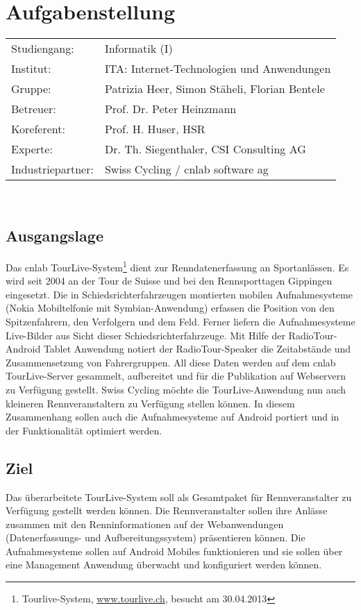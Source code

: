 \chapter*{Aufgabenstellung}
\begin{tabular}{ll}
	Studiengang: & Informatik (I) \\
	Institut: & ITA: Internet-Technologien und Anwendungen \\
	Gruppe: & Patrizia Heer, Simon Stäheli, Florian Bentele \\
	Betreuer: & Prof. Dr. Peter Heinzmann  \\
	Koreferent: & Prof. H. Huser, HSR \\
	Experte: & Dr. Th. Siegenthaler, CSI Consulting AG  \\
	Industriepartner: & Swiss Cycling / cnlab software ag \\    
\end{tabular}\\

\section*{Ausgangslage}
Das cnlab TourLive-System\footnote{Tourlive-System, \url{www.tourlive.ch}, besucht am 30.04.2013} dient zur Renndatenerfassung an Sportanlässen. Es wird seit 2004 an der Tour de Suisse und bei den Rennsporttagen Gippingen eingesetzt. Die in Schiedsrichterfahrzeugen montierten mobilen Aufnahmesysteme (Nokia Mobiltelfonie mit Symbian-Anwendung) erfassen die Position von den Spitzenfahrern, den Verfolgern und dem Feld. Ferner liefern die Aufnahmesysteme Live-Bilder aus Sicht dieser Schiedsrichterfahrzeuge. Mit Hilfe der RadioTour-Android Tablet Anwendung notiert der RadioTour-Speaker die Zeitabstände und Zusammensetzung von Fahrergruppen. All diese Daten werden auf dem cnlab TourLive-Server gesammelt, aufbereitet und für die Publikation auf Webservern zu Verfügung gestellt. 
Swiss Cycling möchte die TourLive-Anwendung nun auch kleineren Rennveranstaltern zu Verfügung stellen können. In diesem Zusammenhang sollen auch die Aufnahmesysteme auf Android portiert und in der Funktionalität optimiert werden.
\section*{Ziel}
Das überarbeitete TourLive-System soll als Gesamtpaket für Rennveranstalter zu Verfügung gestellt werden können. Die Rennveranstalter sollen ihre Anlässe zusammen mit den Renninformationen auf der Webanwendungen (Datenerfassungs- und Aufbereitungssystem) präsentieren können. Die Aufnahmesysteme sollen auf Android Mobiles funktionieren und sie sollen über eine Management Anwendung überwacht und konfiguriert werden können.
